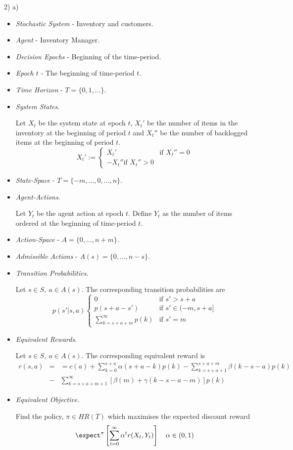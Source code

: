 \documentclass[11pt,a4paper]{article}
\begin{document}
\begin{answer}{2) a)}
  \begin{itemize}
    \item \textit{Stochastic System} - Inventory and customers.
    \item \textit{Agent} - Inventory Manager.
    \item \textit{Decision Epochs} - Beginning of the time-period.
    \item \textit{Epoch $t$} - The beginning of time-period $t$.
    \item \textit{Time Horizon} - $T=\{0,1,\dots\}$.
    \item \textit{System States}.
    \par Let $X_t$ be the system state at epoch $t$, $X_t'$ be the number of items in the inventory at the beginning of period $t$ and $X_t''$ be the number of backlogged items at the beginning of period $t$.
    \[ X_t':=\begin{cases}X_t'&\text{if }X_t''=0\\-X_t''\text{if }X_t''>0\end{cases} \]
    \item \textit{State-Space} - $T=\{-m,\dots,0,\dots,n\}$.
    \item \textit{Agent-Actions}.
    \par Let $Y_t$ be the agent action at epoch $t$. Define $Y_t$ as the number of items ordered at the beginning of time-period $t$.
    \item \textit{Action-Space} - $A=\{0,\dots,n+m\}$.
    \item \textit{Admissible Actions} - $A(s)=\{0,\dots,n-s\}$.
    \item \textit{Transition Probabilities}.
    \par Let $s\in S,\ a\in A(s)$. The corresponding transition probabilities are
    \[ p(s'|s,a)\begin{cases}
      0&\text{if }s'>s+a\\
      p(s+a-s')&\text{if }s'\in(-m,s+a]\\
      \sum_{k=s+a+m}^\infty p(k)&\text{if }s'=m
    \end{cases} \]
    \item \textit{Equivalent Rewards}.
    \par Let $s\in S,\ a\in A(s)$. The corresponding equivalent reward is
    \[\begin{array}{rcl}
      r(s,a)&=&=c(a)+\sum_{k=0}^{s+a}\alpha(s+a-k)p(k)-\sum_{k=s+a+1}^{s+a+m}\beta(k-s-a)p(k)\\
      &-&\sum_{k=s+a+m+1}^\infty\left[\beta(m)+\gamma(k-s-a-m)\right]p(k)
      \end{array}\]
    \item \textit{Equivalent Objective}.
    \par Find the policy, $\pi\in HR(T)$ which maximises the expected discount reward
    \[ \expect^\pi\left[\sum_{t=0}^\infty\alpha^tr(X_t,Y_t)\right]\quad\alpha\in(0,1) \]
  \end{itemize}
\end{answer}
\end{document}
